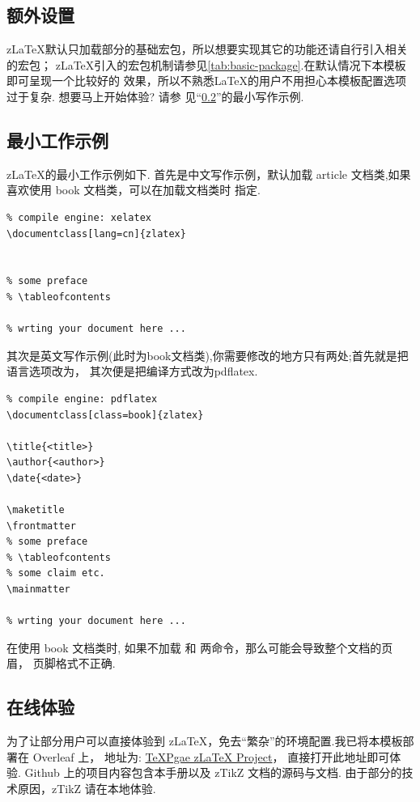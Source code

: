 \subsection{额外设置}
z\LaTeX{}默认只加载部分的基础宏包，所以想要实现其它的功能还请自行引入相关的宏包；
z\LaTeX{}引入的宏包机制请参见\cref{tab:basic-package}.在默认情况下本模板即可呈现一个比较好的
效果，所以不熟悉\LaTeX{}的用户不用担心本模板配置选项过于复杂. 想要马上开始体验? 请参
见``\cref{最小工作示例}''的最小写作示例.

\subsection{最小工作示例}\label{最小工作示例}
z\LaTeX{}的最小工作示例如下.
首先是中文写作示例，默认加载 {article} 文档类,如果喜欢使用 {book} 文档类，可以在加载文档类时
指定.

\begin{verbatim}
% compile engine: xelatex 
\documentclass[lang=cn]{zlatex}


% some preface
% \tableofcontents

% wrting your document here ...

\end{verbatim}

其次是英文写作示例(此时为{book}文档类),你需要修改的地方只有两处;首先就是把语言选项改为，
其次便是把编译方式改为{pdflatex}.

\begin{verbatim}
% compile engine: pdflatex 
\documentclass[class=book]{zlatex}

\title{<title>}
\author{<author>}
\date{<date>}

\maketitle
\frontmatter
% some preface
% \tableofcontents
% some claim etc.
\mainmatter

% wrting your document here ...

\end{verbatim}

在使用 book 文档类时, 如果不加载 \cmd[F]{\frontmatter} 和 \cmd[F]{\mainmatter} 两命令，那么可能会导致整个文档的页眉，
页脚格式不正确.

\subsection{在线体验}
为了让部分用户可以直接体验到 z\LaTeX{}，免去``繁杂''的环境配置.我已将本模板部署在 Overleaf 上，
地址为: \href{https://www.texpage.com/share/71cb8cc2106a4788b830e773fc77c5ab}{TeXPgae z\LaTeX{} Project}，
直接打开此地址即可体验. Github 上的项目内容包含本手册以及 zTikZ 文档的源码与文档. 由于部分的技术原因，zTikZ 
请在本地体验.



